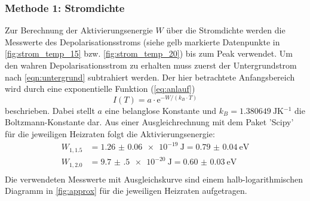 \subsubsection{Methode 1: Stromdichte}
Zur Berechnung der Aktivierungsenergie $W$ über die Stromdichte werden die Messwerte des Depolarisationsstroms (siehe gelb markierte Datenpunkte in \autoref{fig:strom_temp_15} bzw. \autoref{fig:strom_temp_20}) bis zum Peak verwendet.
Um den wahren Depolarisationsstrom zu erhalten muss zuerst der Untergrundstrom nach \autoref{eqn:untergrund} subtrahiert werden.
Der hier betrachtete Anfangsbereich wird durch eine exponentielle Funktion (\autoref{eq:anlauf})
\begin{equation*}
    I(T) = a \cdot \mathrm{e}^{- W / (k_B \cdot T)}
\end{equation*}
beschrieben.
Dabei stellt $a$ eine belanglose Konstante und $k_B = \SI{1.380649}{\joule \kelvin^{-1}}$\cite{constants} die Boltzmann-Konstante dar.
Aus einer Ausgleichrechnung mit dem Paket 'Scipy'\cite{scipy} für die jeweiligen Heizraten folgt die Aktivierungsenergie:
\begin{align*}
    W_{1, 1.5} &= \SI{1.26(6)e-19}{\joule} = \SI{0.79(4)}{\electronvolt} \\
    W_{1, 2.0} &= \SI{9.7(5)e-20}{\joule} = \SI{0.60(3)}{\electronvolt} \\
\end{align*}
Die verwendeten Messwerte mit Ausgleichskurve sind einem halb-logarithmischen Diagramm in \autoref{fig:approx} für die jeweiligen Heizraten aufgetragen.
